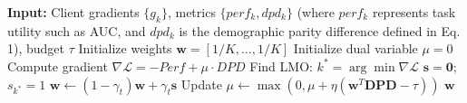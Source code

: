 \begin{algorithm}
\caption{Bi-Objective Frank-Wolfe Aggregation (BFWA)}
\begin{algorithmic}[1]
\STATE \textbf{Input:} Client gradients $\{g_k\}$, metrics $\{perf_k, dpd_k\}$ (where $perf_k$ represents task utility such as AUC, and $dpd_k$ is the demographic parity difference defined in Eq. 1), budget $\tau$
\STATE Initialize weights $\mathbf{w} = [1/K, \dots, 1/K]$
\STATE Initialize dual variable $\mu = 0$
    \STATE Compute gradient $\nabla \mathcal{L} = -Perf + \mu \cdot DPD$
    \STATE Find LMO: $k^* = \arg\min \nabla \mathcal{L}$
    \STATE $\mathbf{s} = \mathbf{0}$; $s_{k^*} = 1$
    \STATE $\mathbf{w} \leftarrow (1-\gamma_t)\mathbf{w} + \gamma_t \mathbf{s}$
    \STATE Update $\mu \leftarrow \max(0, \mu + \eta (\mathbf{w}^T \mathbf{DPD} - \tau))$
\ENDFOR
\RETURN $\mathbf{w}$
\end{algorithmic}
\label{alg:bfwa}
\end{algorithm}
